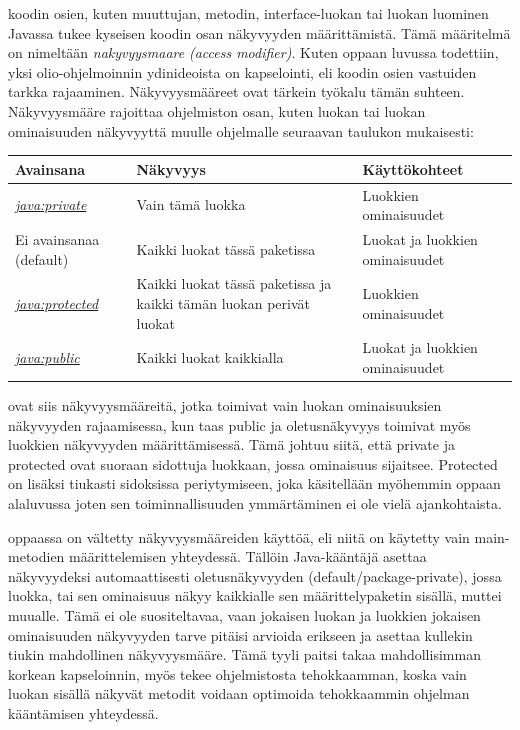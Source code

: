 \documentclass[a4paper,justified,notoc]{tufte-book}
\newcommand{\eng}[1]{\textit{(#1)}}
\newcommand{\new}[1]{\textit{\gls{#1}}}
\newcommand{\neweng}[2]{\new{#1} \eng{#2}}
\newcommand{\java}[1]{\underline{\gls{java:#1}}}
\newcommand{\newjava}[1]{\textit{\java{#1}}}
\begin{document}
\begin{fullwidth}
 koodin osien, kuten muuttujan, metodin, interface-luokan tai luokan
luominen Javassa tukee kyseisen koodin osan näkyvyyden määrittämistä. Tämä määritelmä on nimeltään 
\neweng{nakyvyysmaare}{access modifier}. Kuten oppaan luvussa  todettiin,
yksi olio-ohjelmoinnin ydinideoista on \gls{kapselointi}, eli koodin osien vastuiden tarkka
rajaaminen. Näkyvyysmääreet ovat tärkein työkalu tämän suhteen. Näkyvyysmääre rajoittaa
ohjelmiston osan, kuten luokan tai luokan ominaisuuden näkyvyyttä muulle ohjelmalle seuraavan
taulukon mukaisesti:

\bigskip
\begin{center}
\footnotesize
\begin{tabular}{lll}
\toprule
Avainsana & Näkyvyys & Käyttökohteet \\
\midrule
\newjava{private} & Vain tämä luokka & Luokkien ominaisuudet \\
\addlinespace
Ei avainsanaa (default) & Kaikki luokat tässä paketissa & Luokat ja luokkien ominaisuudet \\
\addlinespace
\newjava{protected} & Kaikki luokat tässä paketissa ja kaikki tämän luokan perivät luokat &
Luokkien ominaisuudet \\
\addlinespace
\newjava{public} & Kaikki luokat kaikkialla & Luokat ja luokkien ominaisuudet \\
\bottomrule
\end{tabular}
\end{center}

 ovat siis näkyvyysmääreitä, jotka toimivat vain luokan
ominaisuuksien näkyvyyden rajaamisessa, kun taas public ja oletusnäkyvyys toimivat myös luokkien
näkyvyyden määrittämisessä. Tämä johtuu siitä, että private ja protected ovat suoraan sidottuja
luokkaan, jossa ominaisuus sijaitsee. Protected on lisäksi tiukasti sidoksissa periytymiseen, joka
käsitellään myöhemmin oppaan alaluvussa  joten sen toiminnallisuuden
ymmärtäminen ei ole vielä ajankohtaista.

 oppaassa on vältetty näkyvyysmääreiden käyttöä, eli niitä on käytetty
vain main-metodien määrittelemisen yhteydessä. Tällöin Java-kääntäjä asettaa näkyvyydeksi
automaattisesti oletusnäkyvyyden (default/package-private), jossa luokka, tai sen ominaisuus näkyy
kaikkialle sen määrittelypaketin sisällä, muttei muualle. Tämä ei ole suositeltavaa, vaan jokaisen
luokan ja luokkien jokaisen ominaisuuden näkyvyyden tarve pitäisi arvioida erikseen ja asettaa
kullekin tiukin mahdollinen näkyvyysmääre. Tämä tyyli paitsi takaa mahdollisimman korkean
kapseloinnin, myös tekee ohjelmistosta tehokkaamman, koska vain luokan sisällä näkyvät metodit
voidaan optimoida tehokkaammin ohjelman kääntämisen yhteydessä.


\end{fullwidth}
\end{document}
